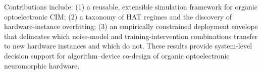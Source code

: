 \begin{englishabstract}
Contributions include:
(1) a reusable, extensible simulation framework for organic optoelectronic CIM;
(2) a taxonomy of HAT regimes and the discovery of hardware-instance overfitting;
(3) an empirically constrained deployment envelope that delineates which noise-model and training-intervention combinations transfer to new hardware instances and which do not.
These results provide system-level decision support for algorithm--device co-design of organic optoelectronic neuromorphic hardware.
\end{englishabstract}
